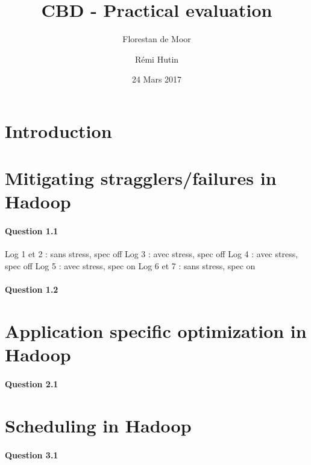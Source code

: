 \documentclass[a4paper]{article}
\begin{document}
\title{CBD - Practical evaluation}
\author{Florestan de Moor}
\author{Rémi Hutin}
\date{24 Mars 2017}

\maketitle

\section*{Introduction}

\section{Mitigating stragglers/failures in Hadoop}

\paragraph{Question 1.1}

Log 1 et 2 : sans stress, spec off
Log 3 : avec stress, spec off
Log 4 : avec stress, spec off
Log 5 : avec stress, spec on
Log 6 et 7 : sans stress, spec on


\paragraph{Question 1.2}


\section{Application specific optimization in Hadoop}

\paragraph{Question 2.1}


\section{Scheduling in Hadoop}

\paragraph{Question 3.1}
\end{document}

